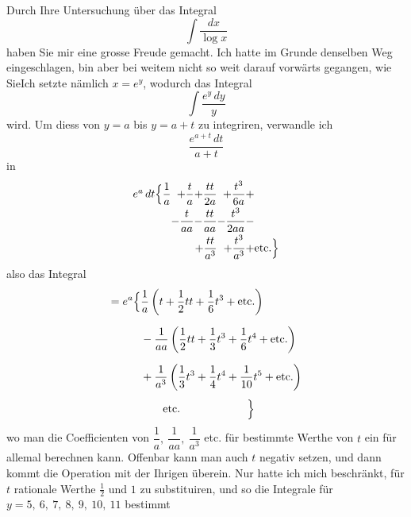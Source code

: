 \clearpage{}\NoSourceHead
{}
\quad Durch Ihre Untersuchung über das Integral
\[
\int\frac{dx}{\log x}
\]
\noindent haben Sie mir eine grosse Freude gemacht. Ich hatte im Grunde denselben Weg eingeschlagen, bin aber bei weitem nicht so weit darauf vorwärts gegangen, wie Sie\quad Ich setzte nämlich $x=e^y$, wodurch das Integral
\[
\int\frac{e^y\,dy}{y}
\]
\noindent wird. Um diess von $y=a$ bis $y=a+t$ zu integriren, verwandle ich
\[
\frac{e^{a+t}\,dt}{a+t}
\]
\noindent in
\[
\begin{array}{@{}r@{}r@{}r@{}r@{}l@{}}
e^a\,dt\Bigl\{\dfrac{1}{a}&+\dfrac{t}{a}&+\dfrac{tt}{2a}&+\dfrac{t^3}{6a}&+\\[6pt]
&-\dfrac{t}{aa}&-\dfrac{tt}{aa}&-\dfrac{t^3}{2aa}&-\\[6pt]
&&+\dfrac{tt}{a^3}&+\dfrac{t^3}{a^3}&+\text{etc.}\Bigr\}
\end{array}
\]
\noindent also das Integral
\clearpage{}
\[
\begin{aligned}
=e^a\Bigl\{&\frac{1}{a}\left(t+\frac{1}{2}tt+\frac{1}{6}t^3+\text{etc.}\right)\\[6pt]
&-\frac{1}{aa}\left(\frac{1}{2}tt+\frac{1}{3}t^3+\frac{1}{6}t^4+\text{etc.}\right)\\[6pt]
&+\frac{1}{a^3}\left(\frac{1}{3}t^3+\frac{1}{4}t^4+\frac{1}{10}t^5+\text{etc.}\right)\\[4pt]
&\qquad\text{etc.}\qquad\qquad\qquad\Bigr\}
\end{aligned}
\]
\noindent wo man die Coefficienten von $\dfrac{1}{a},\ \dfrac{1}{aa},\ \dfrac{1}{a^3}$ etc. für bestimmte Werthe von $t$ ein für allemal berechnen kann. Offenbar kann man auch $t$ negativ setzen, und dann kommt die Operation mit der Ihrigen überein. Nur hatte ich mich beschränkt, für $t$ rationale Werthe $\frac{1}{2}$ und $1$ zu substituiren, und so die Integrale für $y=5,\ 6,\ 7,\ 8,\ 9,\ 10,\ 11$ bestimmt
\par
